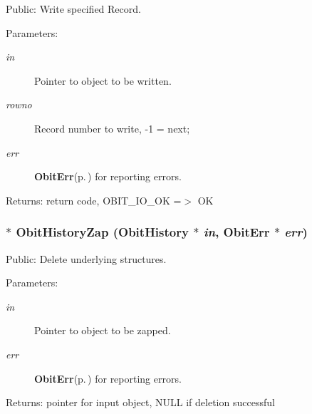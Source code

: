 Public: Write specified Record. 

\begin{Desc}
\item[Parameters:]
\begin{description}
\item[{\em in}]Pointer to object to be written. \item[{\em rowno}]Record number to write, -1 = next; \item[{\em err}]{\bf Obit\-Err}{\rm (p.\,\pageref{structObitErr})} for reporting errors. \end{description}
\end{Desc}
\begin{Desc}
\item[Returns:]return code, OBIT\_\-IO\_\-OK =$>$ OK \end{Desc}
\subsubsection{$\ast$ Obit\-History\-Zap ({\bf Obit\-History} $\ast$ {\em in}, {\bf Obit\-Err} $\ast$ {\em err})}\label{ObitHistory_8h_a12}


Public: Delete underlying structures. 

\begin{Desc}
\item[Parameters:]
\begin{description}
\item[{\em in}]Pointer to object to be zapped. \item[{\em err}]{\bf Obit\-Err}{\rm (p.\,\pageref{structObitErr})} for reporting errors. \end{description}
\end{Desc}
\begin{Desc}
\item[Returns:]pointer for input object, NULL if deletion successful \end{Desc}
